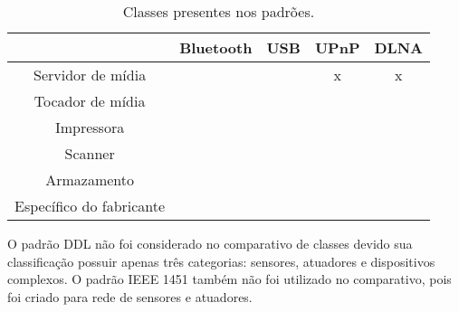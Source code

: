 \begin{table}
	\begin{center}
		\begin{tabular}{ccccc}
		\hline
							& \textbf{Bluetooth} 	& \textbf{USB}	& \textbf{UPnP} & \textbf{DLNA} \\
		\hline
		\hline
		Servidor de mídia			&						&				& x 			& x				\\
		\hline
		Tocador de mídia			&						&				&				&				\\
		\hline
		Impressora 					&						&				&				&				\\
		\hline
		Scanner						&						&				&				&				\\
		\hline
		Armazamento					&						&				&				&				\\
		\hline
		Específico do fabricante 	&						&				&				&				\\
		\hline								
		\end{tabular}
	\end{center}
	\caption{Classes presentes nos padrões.}
	\label{tab:comparativoClasses}
\end{table}

O padrão DDL não foi considerado no comparativo de classes devido sua classificação possuir apenas três categorias: sensores, atuadores e dispositivos complexos. O padrão IEEE 1451 também não foi utilizado no comparativo, pois foi criado para rede de sensores e atuadores.